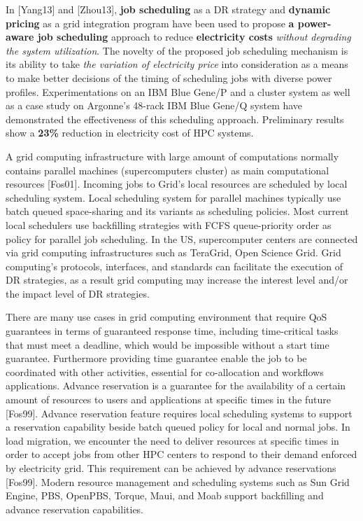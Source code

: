 \documentclass{llncs}
\begin{document}
In [Yang13] and [Zhou13], \textbf{job scheduling} as a DR strategy and
\textbf{dynamic pricing} as a grid integration program have been used to
propose \textbf{a power-aware job scheduling} approach to reduce
\textbf{electricity costs} \textit{without degrading the system utilization}. 
The novelty of the proposed job scheduling
mechanism is its ability to take \textit{the variation of 
electricity price }into consideration as a means to make
better decisions of the timing of scheduling jobs with diverse power
profiles. Experimentations on an IBM Blue Gene/P and a cluster system as
well as a case study on Argonne's 48-rack IBM Blue Gene/Q system have
demonstrated the effectiveness of this scheduling approach. Preliminary
results show a \textbf{23{\%}} reduction in electricity cost of HPC systems.

A grid computing infrastructure with large amount of computations normally
contains parallel machines (supercomputers cluster) as main computational
resources [Fos01]. Incoming jobs to Grid's local resources are scheduled by
local scheduling system. Local scheduling system for parallel machines
typically use batch queued space-sharing and its variants as scheduling
policies. Most current local schedulers use backfilling strategies with FCFS
queue-priority order as policy for parallel job scheduling. In the US,
supercomputer centers are connected via grid computing infrastructures such
as TeraGrid, Open Science Grid. Grid computing's protocols, interfaces, and
standards can facilitate the execution of DR strategies, as a result grid
computing may increase the interest level and/or the impact level of DR
strategies.

There are many use cases in grid computing environment that require QoS
guarantees in terms of guaranteed response time, including time-critical
tasks that must meet a deadline, which would be impossible without a start
time guarantee. Furthermore providing time guarantee enable the job to be
coordinated with other activities, essential for co-allocation and workflows
applications. Advance reservation is a guarantee for the availability of a
certain amount of resources to users and applications at specific times in
the future [Fos99]. Advance reservation feature requires local scheduling
systems to support a reservation capability beside batch queued policy for
local and normal jobs. In load migration, we encounter the need to deliver
resources at specific times in order to accept jobs from other HPC centers
to respond to their demand enforced by electricity grid. This requirement
can be achieved by advance reservations [Fos99]. Modern resource management
and scheduling systems such as Sun Grid Engine, PBS, OpenPBS, Torque, Maui,
and Moab support backfilling and advance reservation capabilities.
\end{document}
